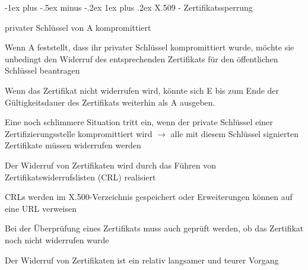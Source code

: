 \documentclass[a4paper]{article}
\makeatletter
\renewcommand{\subsubsection}{\@startsection{subsubsection}{3}{0mm}%
 {-1ex plus -.5ex minus -.2ex}%
 {1ex plus .2ex}%
 {\normalfont\small\bfseries}}
\makeatother
\begin{document}
\begin{multicols}{3}
      \subsubsection{X.509 - Zertifikatssperrung}
      \begin{itemize*}
            \item privater Schlüssel von A kompromittiert
            \begin{itemize*}
                  \item Wenn A feststellt, dass ihr privater Schlüssel kompromittiert wurde, möchte sie unbedingt den Widerruf des entsprechenden Zertifikats für den öffentlichen Schlüssel beantragen
                  \item Wenn das Zertifikat nicht widerrufen wird, könnte sich E bis zum Ende der Gültigkeitsdauer des Zertifikats weiterhin als A ausgeben.
            \end{itemize*}
            \item Eine noch schlimmere Situation tritt ein, wenn der private Schlüssel einer Zertifizierungsstelle kompromittiert wird $\rightarrow$ alle mit diesem Schlüssel signierten Zertifikate müssen widerrufen werden
            \item Der Widerruf von Zertifikaten wird durch das Führen von Zertifikatswiderrufslisten (CRL) realisiert
            \begin{itemize*}
                  \item CRLs werden im X.500-Verzeichnis gespeichert oder Erweiterungen können auf eine URL verweisen
                  \item Bei der Überprüfung eines Zertifikats muss auch geprüft werden, ob das Zertifikat noch nicht widerrufen wurde %
                  \item Der Widerruf von Zertifikaten ist ein relativ langsamer und teurer Vorgang
            \end{itemize*}
      \end{itemize*}


\end{multicols}
\end{document}
